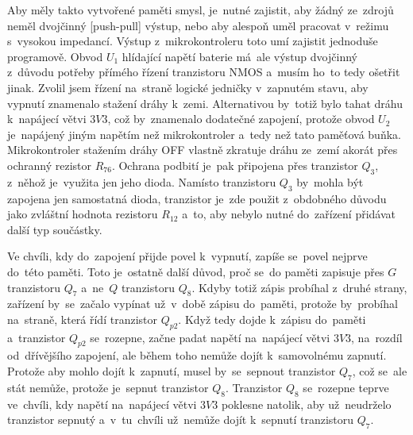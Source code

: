 Aby měly takto vytvořené paměti smysl, je~nutné zajistit, aby žádný ze~zdrojů neměl dvojčinný [push-pull] výstup, nebo aby alespoň uměl pracovat v~režimu s~vysokou impedancí.
Výstup z~mikrokontroleru toto umí zajistit jednoduše programově.
Obvod \(U_{1}\) hlídající napětí baterie má~ale výstup dvojčinný z~důvodu potřeby přímého řízení tranzistoru NMOS a~musím ho~to tedy ošetřit jinak.
Zvolil jsem řízení na~straně logické jedničky v~zapnutém stavu, aby vypnutí znamenalo stažení dráhy k~zemi.
Alternativou by~totiž bylo tahat dráhu k~napájecí větvi \(3V3\), což by~znamenalo dodatečné zapojení, protože obvod \(U_{2}\) je~napájený jiným napětím než mikrokontroler a~tedy než tato paměťová buňka.
Mikrokontroler stažením dráhy OFF vlastně zkratuje dráhu ze~zemí akorát přes ochranný rezistor \(R_{76}\).
Ochrana podbití je~pak připojena přes tranzistor \(Q_{3}\), z~něhož je~využita jen jeho dioda.
Namísto tranzistoru \(Q_{3}\) by~mohla být zapojena jen samostatná dioda, tranzistor je~zde použit z~obdobného důvodu jako zvláštní hodnota rezistoru \(R_{12}\) a~to, aby nebylo nutné do~zařízení přidávat další typ součástky.

Ve chvíli, kdy do~zapojení přijde povel k~vypnutí, zapíše se~povel nejprve do~této paměti.
Toto je~ostatně další důvod, proč se~do paměti zapisuje přes \(G\) tranzistoru \(Q_{7}\) a~ne~\(Q\) tranzistoru \(Q_{8}\).
Kdyby totiž zápis probíhal z~druhé strany, zařízení by~se~začalo vypínat už~v~době zápisu do~paměti, protože by~probíhal na~straně, která řídí tranzistor \(Q_{p2}\).
Když tedy dojde k~zápisu do~paměti a~tranzistor \(Q_{p2}\) se~rozepne, začne padat napětí na~napájecí větvi \(3V3\), na~rozdíl od~dřívějšího zapojení, ale během toho nemůže dojít k~samovolnému zapnutí.
Protože aby mohlo dojít k~zapnutí, musel by~se~sepnout tranzistor \(Q_{7}\), což se~ale stát nemůže, protože je~sepnut tranzistor \(Q_{8}\). 
Tranzistor \(Q_{8}\) se~rozepne teprve ve~chvíli, kdy napětí na~napájecí větvi \(3V3\) poklesne natolik, aby už~neudrželo tranzistor sepnutý a~v~tu~chvíli už~nemůže dojít k~sepnutí tranzistoru \(Q_{7}\).

